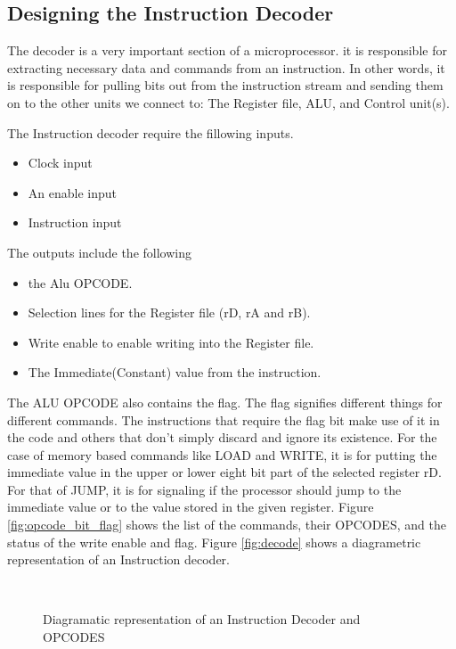 \subsection{Designing the Instruction Decoder}
The decoder is a very important section of a microprocessor. it is responsible for extracting necessary data and commands from an instruction. In other words, it is responsible for pulling bits out from the instruction stream and sending them on to the other units we connect to: The Register file, ALU, and Control unit(s).

The Instruction decoder require the fillowing inputs.
\begin{itemize}
\item Clock input
\item An enable input
\item Instruction input
\end{itemize} 

The outputs include the following 
\begin{itemize}
\item the Alu OPCODE.
\item Selection lines for the Register file (rD, rA and rB).
\item Write enable to enable writing into the Register file.
\item The Immediate(Constant) value from the instruction.
\end{itemize}

The ALU OPCODE also contains the flag. The flag signifies different things for different commands. The instructions that require the flag bit make use of it in the code and others that don't simply discard and ignore its existence. For the case of memory based commands like LOAD and WRITE, it is for putting the immediate value in the upper or lower eight bit part of the selected register rD. For that of JUMP, it is for signaling if the processor should jump to the immediate value or to the value stored in the given register. Figure  \ref{fig:opcode_bit_flag} shows the list of the commands, their OPCODES, and the status of the write enable and flag. Figure \ref{fig:decode} shows a diagrametric representation of an Instruction decoder.


\begin{figure}[p]
\\
\caption{Diagramatic representation of an Instruction Decoder and OPCODES}
\label{fig:globdecode}
\end{figure}


